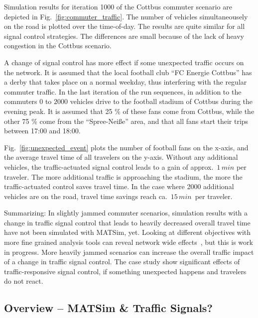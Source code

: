 Simulation results for iteration 1000 of the Cottbus commuter scenario are depicted in
Fig.~\ref{fig:commuter_traffic}. 
The number of vehicles simultaneousely on the road is plotted over the time-of-day. 
The results are quite similar for all signal control strategies. 
The differences are small because of the lack of heavy congestion in the Cottbus scenario. 

A change of signal control has more effect if some unexpected traffic occurs on the network. 
It is assumed that the local football club ``FC Energie Cottbus'' has a derby that takes place on a normal weekday, thus interfering with the regular commuter traffic. 
In the last iteration of the run sequences, in addition to the commuters $0$ to $2000$ vehicles drive to the football stadium of Cottbus during the evening peak. 
It is assumed that 25 \% of these fans come from Cottbus,
while the other 75 \% come from the ``Spree-Nei{\ss}e'' area, and that all fans start their trips between 17:00 and 18:00. 

Fig.~\ref{fig:unexpected_event} plots the number of football fans on
the x-axis, and the average travel time of all travelers on the
y-axis. Without any additional vehicles,
the traffic-actuated signal control leads to a gain of
approx.~$1 \, min$ per traveler.
The more additional traffic is approaching the stadium, the more the traffic-actuated control saves travel time. In the case where 2000 additional vehicles are on the road, travel time savings reach ca.~$15\, min$~per traveler. 

Summarizing: In slightly jammed commuter scenarios, simulation results with a change in traffic signal control that leads to heavily decreased overall travel time have not been simulated with MATSim, yet. 
Looking at different objectives with more fine grained analysis tools can reveal network wide effects~\citep[e.g.~see the analysis using macroscopic fundamental diagrams, pp.114]{Grether2014PhD}, but this is work in progress.  
More heavily jammed scenarios can increase the overall traffic impact of a change in traffic signal control. The case study show significant effects of traffic-responsive signal control, if something unexpected happens and travelers do not react.  

\subsection{Overview -- MATSim \& Traffic Signals?}

